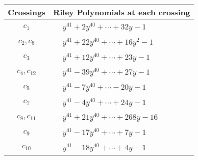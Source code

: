 \documentclass[1p]{elsarticle_modified}
\theoremstyle{definition}
\begin{document}
\begin{tabular}{m{50pt}|m{274pt}}
Crossings & \hspace{64pt}Riley Polynomials at each crossing \\
\hline $$\begin{aligned}c_{1}\end{aligned}$$&$\begin{aligned}
&y^{41}+2 y^{40}+\cdots+32 y-1
\end{aligned}$\\
\hline $$\begin{aligned}c_{2},c_{6}\end{aligned}$$&$\begin{aligned}
&y^{41}+22 y^{40}+\cdots+16 y^2-1
\end{aligned}$\\
\hline $$\begin{aligned}c_{3}\end{aligned}$$&$\begin{aligned}
&y^{41}+12 y^{40}+\cdots+23 y-1
\end{aligned}$\\
\hline $$\begin{aligned}c_{4},c_{12}\end{aligned}$$&$\begin{aligned}
&y^{41}-39 y^{40}+\cdots+27 y-1
\end{aligned}$\\
\hline $$\begin{aligned}c_{5}\end{aligned}$$&$\begin{aligned}
&y^{41}-7 y^{40}+\cdots-20 y-1
\end{aligned}$\\
\hline $$\begin{aligned}c_{7}\end{aligned}$$&$\begin{aligned}
&y^{41}-4 y^{40}+\cdots+24 y-1
\end{aligned}$\\
\hline $$\begin{aligned}c_{8},c_{11}\end{aligned}$$&$\begin{aligned}
&y^{41}+21 y^{40}+\cdots+268 y-16
\end{aligned}$\\
\hline $$\begin{aligned}c_{9}\end{aligned}$$&$\begin{aligned}
&y^{41}-17 y^{40}+\cdots+7 y-1
\end{aligned}$\\
\hline $$\begin{aligned}c_{10}\end{aligned}$$&$\begin{aligned}
&y^{41}-18 y^{40}+\cdots+4 y-1
\end{aligned}$\\
\hline
\end{tabular}\\~\\
\end{document}
